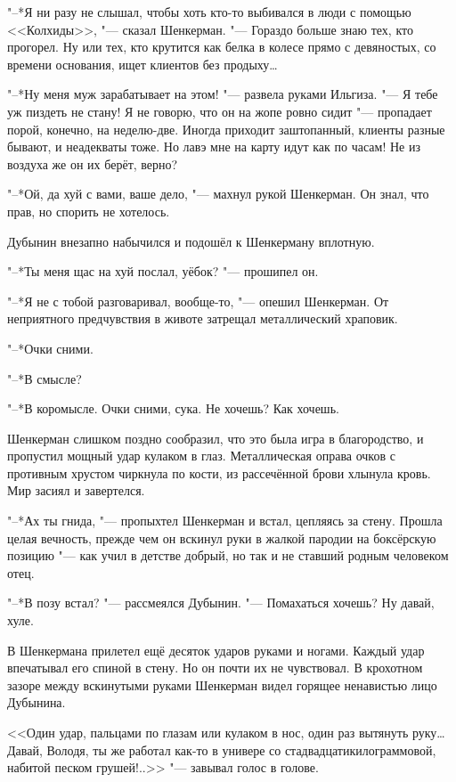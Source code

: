 "--*Я ни разу не слышал, чтобы хоть кто-то выбивался в люди с помощью <<Колхиды>>, "--- сказал Шенкерман.
"--- Гораздо больше знаю тех, кто прогорел.
Ну или тех, кто крутится как белка в колесе прямо с девяностых, со времени основания, ищет клиентов без продыху\ldots{}

"--*Ну меня муж зарабатывает на этом! "--- развела руками Ильгиза.
"--- Я тебе уж пиздеть не стану!
Я не говорю, что он на жопе ровно сидит "--- пропадает порой, конечно, на неделю-две.
Иногда приходит заштопанный, клиенты разные бывают, и неадекваты тоже.
Но лавэ мне на карту идут как по часам!
Не из воздуха же он их берёт, верно?

"--*Ой, да хуй с вами, ваше дело, "--- махнул рукой Шенкерман.
Он знал, что прав, но спорить не хотелось.

Дубынин внезапно набычился и подошёл к Шенкерману вплотную.

"--*Ты меня щас на хуй послал, уёбок? "--- прошипел он.

"--*Я не с тобой разговаривал, вообще-то, "--- опешил Шенкерман.
От неприятного предчувствия в животе затрещал металлический храповик.

"--*Очки сними.

"--*В смысле?

"--*В коромысле.
Очки сними, сука.
Не хочешь?
Как хочешь.

Шенкерман слишком поздно сообразил, что это была игра в благородство, и пропустил мощный удар кулаком в глаз.
Металлическая оправа очков с противным хрустом чиркнула по кости, из рассечённой брови хлынула кровь.
Мир засиял и завертелся.

"--*Ах ты гнида, "--- пропыхтел Шенкерман и встал, цепляясь за стену.
Прошла целая вечность, прежде чем он вскинул руки в жалкой пародии на боксёрскую позицию "--- как учил в детстве добрый, но так и не ставший родным человеком отец.

"--*В позу встал? "--- рассмеялся Дубынин.
"--- Помахаться хочешь?
Ну давай, хуле.

В Шенкермана прилетел ещё десяток ударов руками и ногами.
Каждый удар впечатывал его спиной в стену.
Но он почти их не чувствовал.
В крохотном зазоре между вскинутыми руками Шенкерман видел горящее ненавистью лицо Дубынина.

<<Один удар, пальцами по глазам или кулаком в нос, один раз вытянуть руку\ldots{}
Давай, Володя, ты же работал как-то в универе со стадвадцатикилограммовой, набитой песком грушей!..>> "--- завывал голос в голове.

